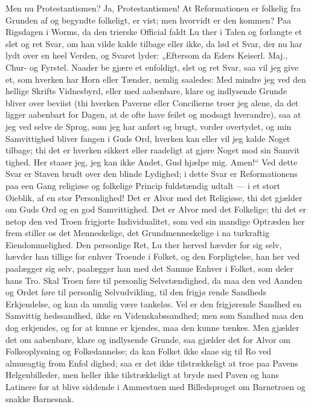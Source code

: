 \documentclass[12pt]{book}
\newcommand{\opage}[1]{\marginnote{\footnotesize\textit{[#1]}}}
\begin{document}
Men nu Protestantismen? Ja, Protestantismen! At
Reformationen er folkelig fra Grunden af og begyndte
folkeligt, er vist; men hvorvidt er den kommen? Paa
Rigsdagen i Worms, da den trierske Official faldt Lu\-%
ther i Talen og forlangte et slet og ret Svar, om han
vilde kalde tilbage eller ikke, da lød et Svar, der nu
har lydt over en heel Verden, og Svaret lyder: „Eftersom
da Eders Keiserl. Maj., Chur- og Fyrstel. Naader be\-%
gjære et enfoldigt, slet og ret Svar, saa vil jeg give et,
som hverken har Horn eller Tænder, nemlig saaledes:
Med mindre jeg ved den hellige Skrifts Vidnesbyrd, eller
med aabenbare, klare og indlysende Grunde bliver over\-%
beviist (thi hverken Paverne eller Concilierne troer jeg
alene, da det ligger aabenbart for Dagen, at de ofte have
feilet og modsagt hverandre), saa at jeg ved selve de
Sprog, som jeg har anført og brugt, vorder overtydet,
og min Samvittighed bliver fangen i Guds Ord, hverken
kan eller vil jeg kalde Noget tilbage; thi det er hverken
sikkert eller raadeligt at gjøre Noget mod sin Samvit\-%
tighed. Her staaer jeg, jeg kan ikke Andet, Gud hjælpe
mig. Amen!“ Ved dette Svar er Staven brudt over
den blinde Lydighed; i dette Svar er Reformationens
paa een Gang religiøse og folkelige Princip fuldstændig
udtalt --- i et stort Øieblik, af en stor Personlighed!
Det er Alvor med det Religiøse, thi det gjælder om
\opage{126}\setcounter{footnote}{0}%
Guds Ord og en god Samvittighed. Det er Alvor med
det Folkelige; thi det er netop den ved Troen frigjorte
Individualitet, som ved sin mandige Optræden her frem\-%
stiller os det Menneskelige, det Grundmenneskelige i na\-%
turkraftig Eiendommelighed. Den personlige Ret, Lu\-%
ther herved hævder for sig selv, hævder han tillige for
enhver Troende i Folket, og den Forpligtelse, han her\-%
ved paalægger sig selv, paalægger han med det Samme
Enhver i Folket, som deler hans Tro. Skal Troen føre
til personlig Selvstændighed, da maa den ved Aanden
og Ordet føre til personlig Selvudvikling, til den frigjø\-%
rende Sandheds Erkjendelse, og kan da umulig være
tankeløs. Vel er den frigjørende Sandhed en Samvittig\-%
hedssandhed, ikke en Videnskabssandhed; men som
Sandhed maa den dog erkjendes, og for at kunne er\-%
kjendes, maa den kunne tænkes. Men gjælder det om
aabenbare, klare og indlysende Grunde, saa gjælder det
for Alvor om Folkeoplysning og Folkedannelse; da kan
Folket ikke slaae sig til Ro ved almueagtig from Enfol\-%
dighed; saa er det ikke tilstrækkeligt at troe paa Pavens
Helgenbilleder, men heller ikke tilstrækkeligt at bryde
med Paven og hans Latinere for at blive siddende i
Ammestuen med Billedsproget om Barnetroen og snakke
Barnesnak.
\end{document}
